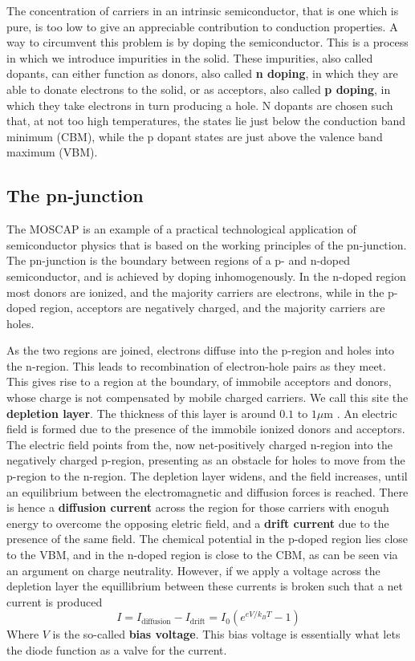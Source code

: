 \documentclass[../main.tex]{subfiles}
\begin{document}
	The concentration of carriers in an intrinsic semiconductor, that is one which is pure, is too low to give an appreciable contribution to conduction properties. A way to circumvent this problem is by doping the semiconductor. This is a process in which we introduce impurities in the solid. These impurities, also called dopants, can either function as donors, also called \textbf{n doping}, in which they are able to donate electrons to the solid, or as acceptors, also called \textbf{p doping}, in which they take electrons in turn producing a hole. N dopants are chosen such that, at not too high temperatures, the states lie just below the conduction band minimum (CBM), while the p dopant states are just above the valence band maximum (VBM). 
	
	\subsection{The pn-junction} 
	The MOSCAP is an example of a practical technological application of semiconductor physics that is based on the working principles of the pn-junction. The pn-junction is the boundary between regions of a p- and n-doped semiconductor, and is achieved by doping inhomogenously. In the n-doped region most donors are ionized, and the majority carriers are electrons, while in the p-doped region, acceptors are negatively charged, and the majority carriers are holes. 
	
	As the two regions are joined, electrons diffuse into the p-region and holes into the n-region. This leads to recombination of electron-hole pairs as they meet. This gives rise to a region at the boundary, of immobile acceptors and donors, whose charge is not compensated by mobile charged carriers. We call this site the \textbf{depletion layer}. The thickness of this layer is around $0.1$ to $1 \mu$m \cite{solidstatephysicsbook}. An electric field is formed due to the presence of the immobile ionized donors and acceptors. The electric field points from the, now net-positively charged n-region into the negatively charged p-region, presenting as an obstacle for holes to move from the p-region to the n-region. The depletion layer widens, and the field increases, until an equilibrium between the electromagnetic and diffusion forces is reached. There is hence a \textbf{diffusion current} across the region for those carriers with enoguh energy to overcome the opposing eletric field, and a \textbf{drift current} due to the presence of the same field. The chemical potential in the p-doped region lies close to the VBM, and in the n-doped region is close to the CBM, as can be seen via an argument on charge neutrality. However, if we apply a voltage across the depletion layer the equillibrium between these currents is broken such that a net current\cite{solidstatephysicsbook} is produced
	\begin{equation}
		I = I_\text{diffusion} - I_\text{drift} = I_0\left(e^{eV/k_BT}-1\right)
	\end{equation}
	Where $V$ is the so-called \textbf{bias voltage}. This bias voltage is essentially what lets the diode function as a valve for the current. 
	
\end{document}
